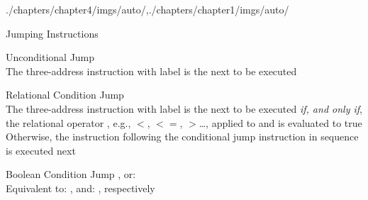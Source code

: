 \begin{graphicspathcontext}{{./chapters/chapter4/imgs/auto/},{./chapters/chapter1/imgs/auto/}}
\begin{bibunit}[apalike]
\begin{frame}[t]{Jumping Instructions}
	\begin{definitionblock}{Unconditional Jump}
		\emph{} \\
		The three-address instruction with label  is the next to be executed
	\end{definitionblock}
	\begin{definitionblock}{Relational Condition Jump}
		\emph{} \\
		The three-address instruction with label  is the next to be executed \emph{if, and only if}, the relational operator , e.g., $<$, $<=$, $>$\dots, applied to  and  is evaluated to true \\
		Otherwise, the instruction following the conditional jump instruction in sequence is executed next
	\end{definitionblock}
	\begin{definitionblock}{Boolean Condition Jump}
		\emph{}, or: \emph{} \\
		Equivalent to: , and: , respectively
	\end{definitionblock}
\end{frame}


\end{bibunit}
\end{graphicspathcontext}
